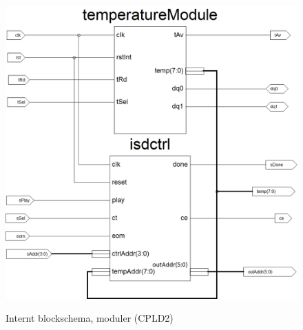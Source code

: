 \documentclass[a4paper,11pt]{article}
\begin{document}
		\begin{figure}[H]
		  \centering
		      \includegraphics[scale=0.40, angle=0]{Xilinx_CPLD2.png}
			\label{fig:BlockDiagram2}
		  	\caption{Internt blockschema, moduler (CPLD2)}
		\end{figure}	
	
\end{document}
